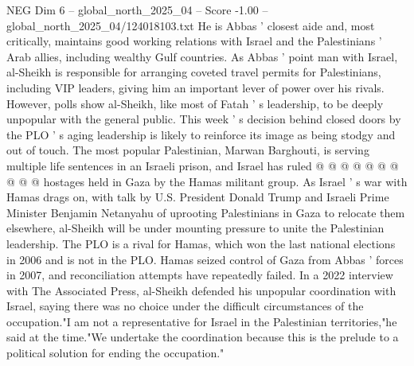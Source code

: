 \begin{textsample}{NEG Dim 6 – global\_north\_2025\_04 – Score -1.00 – global\_north\_2025\_04/124018103.txt}
He is Abbas ' closest aide and, most critically, maintains good working relations with Israel and the Palestinians ' Arab allies, including wealthy Gulf countries.
As Abbas ' point man with Israel, al-Sheikh is responsible for arranging coveted travel permits for Palestinians, including VIP leaders, giving him an important lever of power over his rivals.
However, polls show al-Sheikh, like most of Fatah ' s leadership, to be deeply unpopular with the general public.
This week ' s decision behind closed doors by the PLO ' s aging leadership is likely to reinforce its image as being stodgy and out of touch.
The most popular Palestinian, Marwan Barghouti, is serving multiple life sentences in an Israeli prison, and Israel has ruled @ @ @ @ @ @ @ @ @ @ hostages held in Gaza by the Hamas militant group.
As Israel ' s war with Hamas drags on, with talk by U.S.
President Donald Trump and Israeli Prime Minister Benjamin Netanyahu of uprooting Palestinians in Gaza to relocate them elsewhere, al-Sheikh will be under mounting pressure to unite the Palestinian leadership.
The PLO is a rival for Hamas, which won the last national elections in 2006 and is not in the PLO.
Hamas seized control of Gaza from Abbas ' forces in 2007, and reconciliation attempts have repeatedly failed.
In a 2022 interview with The Associated Press, al-Sheikh defended his unpopular coordination with Israel, saying there was no choice under the difficult circumstances of the occupation."I am not a representative for Israel in the Palestinian territories,"he said at the time."We undertake the coordination because this is the prelude to a political solution for ending the occupation."

\end{textsample}
